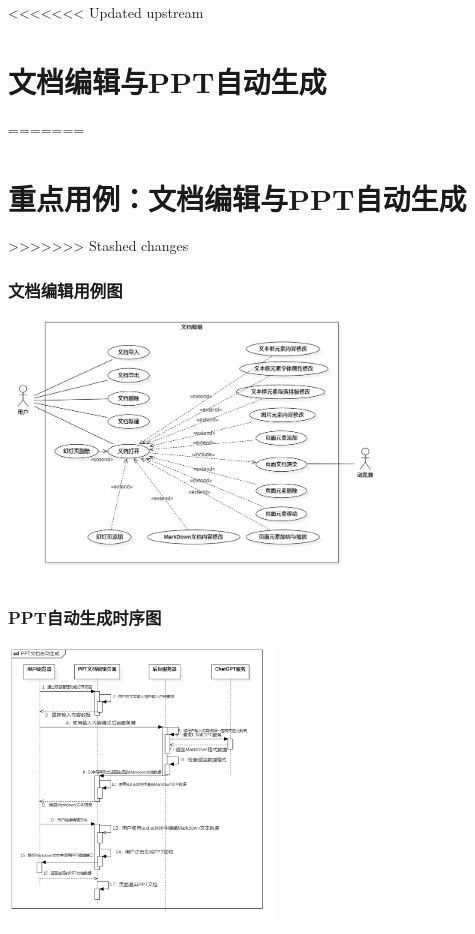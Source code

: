 <<<<<<< Updated upstream
\section{文档编辑与PPT自动生成}
=======
\section{重点用例：文档编辑与PPT自动生成}
>>>>>>> Stashed changes
\begin{frame}
    \frametitle{文档编辑用例图}
    \center
    \includegraphics[width=4.0in]{contents/figure/ppt_generator_usercase_diagram.png}
\end{frame}
\begin{frame}
    \frametitle{PPT自动生成时序图}
    \center
    \includegraphics[width=2.8in]{contents/figure/ppt_generator_sequence_diagram.png}
\end{frame}